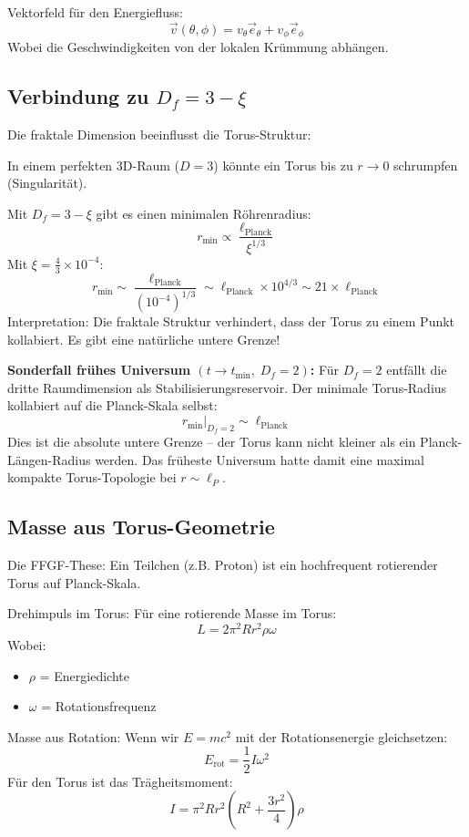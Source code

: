 	Vektorfeld für den Energiefluss:
	\[
	\vec{v}(\theta, \phi) = v_\theta \vec{e}_\theta + v_\phi \vec{e}_\phi
	\]
	Wobei die Geschwindigkeiten von der lokalen Krümmung abhängen.
	
	\subsection{Verbindung zu \( D_f = 3 - \xi \)}
	Die fraktale Dimension beeinflusst die Torus-Struktur:
	
	In einem perfekten 3D-Raum (\( D = 3 \)) könnte ein Torus bis zu \( r \to 0 \) schrumpfen (Singularität).
	
	Mit \( D_f = 3 - \xi \) gibt es einen minimalen Röhrenradius:
	\[
	r_{\text{min}} \propto \frac{\ell_{\text{Planck}}}{\xi^{1/3}}
	\]
	Mit \( \xi = \frac{4}{3} \times 10^{-4} \):
	\[
	r_{\text{min}} \sim \frac{\ell_{\text{Planck}}}{(10^{-4})^{1/3}} \sim \ell_{\text{Planck}} \times 10^{4/3} \sim 21 \times \ell_{\text{Planck}}
	\]
	Interpretation: Die fraktale Struktur verhindert, dass der Torus zu einem Punkt kollabiert. Es gibt eine natürliche untere Grenze!

	\textbf{Sonderfall frühes Universum \((t \to t_{\min},\; D_f = 2)\):}
	Für $D_f = 2$ entfällt die dritte Raumdimension als Stabilisierungsreservoir. Der minimale Torus-Radius kollabiert auf die Planck-Skala selbst:
	\[
	r_{\text{min}}\big|_{D_f=2} \sim \ell_{\text{Planck}}
	\]
	Dies ist die absolute untere Grenze – der Torus kann nicht kleiner als ein Planck-Längen-Radius werden. Das früheste Universum hatte damit eine maximal kompakte Torus-Topologie bei $r \sim \ell_P$.
	
	\subsection{Masse aus Torus-Geometrie}
	Die FFGF-These: Ein Teilchen (z.B. Proton) ist ein hochfrequent rotierender Torus auf Planck-Skala.
	
	Drehimpuls im Torus:
	Für eine rotierende Masse im Torus:
	\[
	L = 2\pi^2 R r^2 \rho \omega
	\]
	Wobei:
	\begin{itemize}
		\item \( \rho \) = Energiedichte
		\item \( \omega \) = Rotationsfrequenz
	\end{itemize}
	
	Masse aus Rotation:
	Wenn wir \( E = mc^2 \) mit der Rotationsenergie gleichsetzen:
	\[
	E_{\text{rot}} = \frac{1}{2} I \omega^2
	\]
	Für den Torus ist das Trägheitsmoment:
	\[
	I = \pi^2 R r^2 \left(R^2 + \frac{3r^2}{4}\right) \rho
	\]
	
